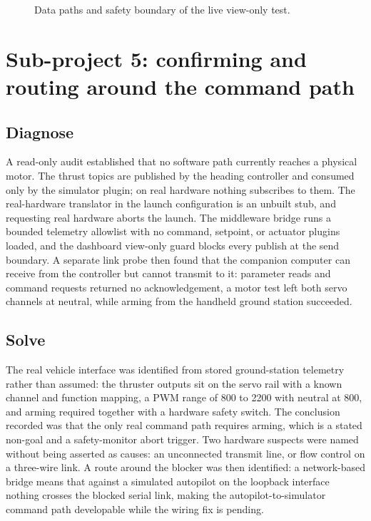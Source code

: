 \documentclass[a4paper,12pt,oneside,openany]{report}
\begin{document}
\begin{figure}[tbp]
{}
  \caption{Data paths and safety boundary of the live view-only test.}
  \label{fig:live-dataflow}
\end{figure}

\section{Sub-project 5: confirming and routing around the command path}
\label{sec:sub-command}

\subsection{Diagnose}

A read-only audit established that no software path currently reaches a physical motor. The thrust
topics are published by the heading controller and consumed only by the simulator plugin; on real
hardware nothing subscribes to them. The real-hardware translator in the launch configuration is an
unbuilt stub, and requesting real hardware aborts the launch. The middleware bridge runs a bounded
telemetry allowlist with no command, setpoint, or actuator plugins loaded, and the dashboard
view-only guard blocks every publish at the send boundary. A separate link probe then found that the
companion computer can receive from the controller but cannot transmit to it: parameter reads and
command requests returned no acknowledgement, a motor test left both servo channels at neutral,
while arming from the handheld ground station succeeded.

\subsection{Solve}

The real vehicle interface was identified from stored ground-station telemetry rather than assumed:
the thruster outputs sit on the servo rail with a known channel and function mapping, a PWM range of
800 to 2200 with neutral at 800, and arming required together with a hardware safety switch. The
conclusion recorded was that the only real command path requires arming, which is a stated non-goal
and a safety-monitor abort trigger. Two hardware suspects were named without being asserted as
causes: an unconnected transmit line, or flow control on a three-wire link. A route around the
blocker was then identified: a network-based bridge means that against a simulated autopilot on the
loopback interface nothing crosses the blocked serial link, making the autopilot-to-simulator
command path developable while the wiring fix is pending.
\end{document}
